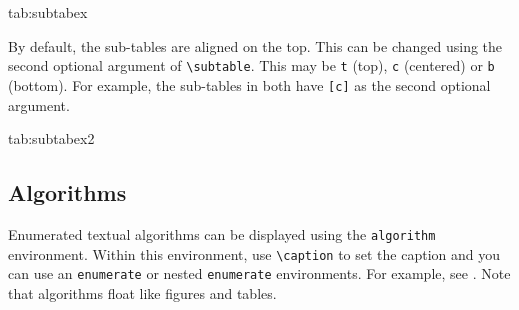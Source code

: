 \documentclass[pmlr,twocolumn]{jmlr} %
\begin{document}
\begin{table}[htbp]
\floatconts
 {tab:subtabex}
 {\caption{An Example With Sub-Tables}}
 {%
   \qquad
 }
\end{table}

By default, the sub-tables are aligned on the top.
This can be changed using the second optional argument
of \verb|\subtable|. This may be \texttt{t} (top), \texttt{c}
(centered) or \texttt{b} (bottom). For example, the sub-tables
 in 
both have \verb|[c]| as the second optional argument.

\begin{table}[htbp]
\floatconts
 {tab:subtabex2}
 {\caption{Another Example With Sub-Tables}}
 {%
   \qquad
 }
\end{table}

\subsection{Algorithms}
\label{sec:algorithms}

Enumerated textual algorithms can be displayed using the
\texttt{algorithm} environment. Within this environment, use
\verb|\caption| to set the caption and you can use an
\texttt{enumerate} or nested \texttt{enumerate} environments.
For example, see . Note that algorithms
float like figures and tables.
\end{document}
